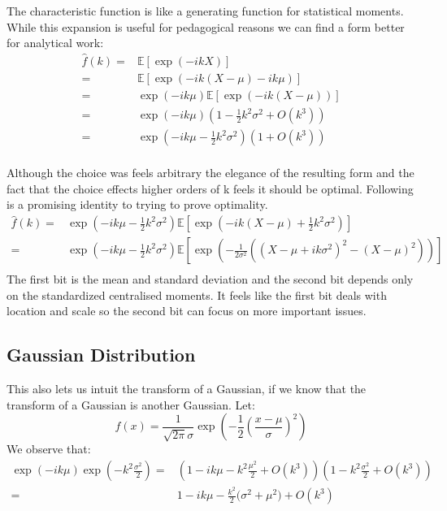 \documentclass[12pt]{report}
\begin{document}
The characteristic function is like a generating function for statistical moments.
While this expansion is useful for pedagogical reasons we can find a form better for analytical work:
\begin{equation*}
\begin{aligned}
\hat{f}(k) =& \mathbb{E}[\exp(-ikX)]\\
=& \mathbb{E}\left[\exp\left(-ik(X-\mu)-ik\mu\right)\right]\\
=& \exp\left(-ik\mu\right)\mathbb{E}\left[\exp\left(-ik(X-\mu)\right)\right]\\
=& \exp\left(-ik\mu\right)\left(1-\frac{1}{2}k^2\sigma^2+O(k^3)\right)\\
=& \exp\left(-ik\mu-\frac{1}{2}k^2\sigma^2\right)\left(1+O(k^3)\right)\\
\end{aligned}
\end{equation*}

Although the choice was feels arbitrary the elegance of the resulting form and the fact that the choice effects higher orders of k feels it should be optimal.
Following is a promising identity to trying to prove optimality. 
\begin{equation*}
\begin{aligned}
\hat{f}(k)=& \exp\left(-ik\mu-\frac{1}{2}k^2\sigma^2\right)\mathbb{E}\left[\exp\left(-ik(X-\mu)+\frac{1}{2}k^2\sigma^2\right)\right]\\
=& \exp\left(-ik\mu-\frac{1}{2}k^2\sigma^2\right)\mathbb{E}\left[\exp\left(-\frac{1}{2\sigma^2}\left((X-\mu+ik\sigma^2)^2-(X-\mu)^2\right)\right)\right]\\
\end{aligned}
\end{equation*}
The first bit is the mean and standard deviation and the second bit depends only on the standardized centralised moments.
It feels like the first bit deals with location and scale so the second bit can focus on more important issues.

\subsection{Gaussian Distribution}
This also lets us intuit the transform of a Gaussian, if we know that the transform of a Gaussian is another Gaussian.
Let:
\[f(x) = \frac{1}{\sqrt{2\pi}\sigma}\exp\left(-\frac{1}{2}\left(\frac{x-\mu}{\sigma}\right)^2\right)\]
We observe that:
\begin{equation*}
\begin{aligned}
\exp(-ik\mu)\exp\left(-k^2\frac{\sigma^2}{2}\right) =& \left(1-ik\mu -k^2\frac{\mu^2}{2} + O(k^3)\right)\left(1-k^2\frac{\sigma^2}{2}+O(k^3)\right)\\
	=&1-ik\mu-\frac{k^2}{2}\big(\sigma^2+\mu^2\big) + O(k^3)\\
\end{aligned}
\end{equation*}
\end{document}
